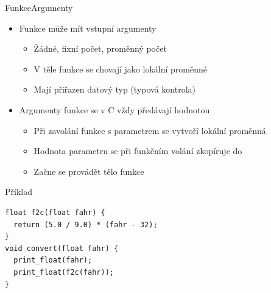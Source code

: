 \begin{frame}[fragile]{Funkce}{Argumenty}

  \begin{itemize}
    \item Funkce může mít vstupní argumenty
    \begin{itemize}
      \item Žádné, fixní počet, proměnný počet

      \pause

      \item V těle funkce se chovají jako lokální proměnné
      \item Mají přiřazen datový typ (typová kontrola)
    \end{itemize}

    \pause

    \item Argumenty funkce se v C vždy předávají hodnotou
    \begin{itemize}
      \item Při zavolání funkce s parametrem se vytvoří lokální proměnná
      \item Hodnota parametru  se při funkčním volání zkopíruje do
      \item Začne se provádět tělo funkce
    \end{itemize}
  \end{itemize}


\begin{block}{Příklad}
\begin{lstlisting}
float f2c(float fahr) {
  return (5.0 / 9.0) * (fahr - 32);
}
void convert(float fahr) {
  print_float(fahr);
  print_float(f2c(fahr));
}
\end{lstlisting}
\end{block}

\end{frame}

